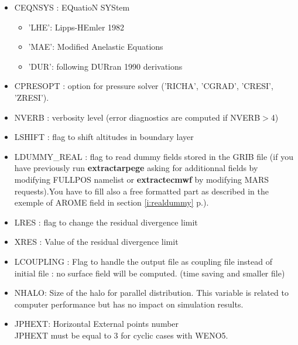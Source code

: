 \begin{itemize}
\item CEQNSYS : EQuatioN SYStem
\begin{itemize}
\item 'LHE': Lipps-HEmler 1982
\item 'MAE': Modified Anelastic Equations
\item 'DUR': following DURran 1990 derivations
\end{itemize}

\item CPRESOPT : option for pressure solver 
('RICHA', 'CGRAD', 'CRESI', 'ZRESI').

\item NVERB : verbosity level (error diagnostics are computed if
NVERB$>$4)

\item LSHIFT : flag to shift altitudes in boundary layer

\item LDUMMY\_REAL : flag to read dummy fields stored in the GRIB file (if you have previously run {\bf extractarpege}
asking for additionnal fields by modifying FULLPOS namelist or {\bf extractecmwf} by modifying MARS requests).You have to fill also a free formatted part as described in the exemple of AROME field in section \ref{i:realdummy} p.\pageref{i:realdummy}).

\item LRES : flag to change the residual divergence limit

\item XRES : Value of the residual divergence limit

\item LCOUPLING : Flag to handle the output file as coupling file instead of initial file : no surface field will be computed. (time saving and smaller file) 

\item
NHALO: Size of the halo for parallel distribution.
This variable is related to computer performance but has no
impact on simulation results.\\

\item
JPHEXT:  Horizontal External points number\\
JPHEXT must be equal to 3 for cyclic cases with WENO5.

\end{itemize}



